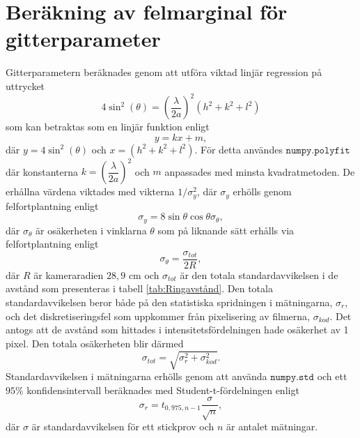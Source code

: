 \documentclass[12pt, a4paper]{article}
\begin{document}
\newpage

\appendix
\section{Beräkning av felmarginal för gitterparameter}
\label{app:felmarg_gitterparameter}
Gitterparametern beräknades genom att utföra viktad linjär regression på uttrycket
\begin{equation}
    4\sin^2(\theta) = \left(\dfrac \lambda {2a}\right)^2 (h^2+k^2+l^2)
\end{equation}
som kan betraktas som en linjär funktion enligt
\begin{equation}
    y = k x + m,
\end{equation}
där $y = 4\sin^2(\theta)$ och $x = (h^2+k^2+l^2)$. För detta användes $\texttt{numpy.polyfit}$ där konstanterna $k = \left(\dfrac \lambda {2a}\right)^2$ och $m$ anpassades 
med minsta kvadratmetoden. De erhållna värdena viktades med vikterna $1/\sigma^2_{y}$, där $\sigma_{y}$ erhölls genom felfortplantning enligt 
\begin{equation}
    \sigma_y = 8\sin\theta \cos\theta \sigma_\theta,
\end{equation}
där $\sigma_\theta$ är osäkerheten i vinklarna $\theta$ som på liknande sätt erhålls via felfortplantning enligt
\begin{equation}
    \sigma_\theta = \dfrac{\sigma_{tot}}{2R},
\end{equation}
där $R$ är kameraradien $28,9$ cm och $\sigma_{tot}$ är den totala standardavvikelsen i de avstånd som presenteras i tabell \ref{tab:Ringavstånd}. Den totala standardavvikelsen beror både
på den statistiska spridningen i mätningarna, $\sigma_r$, och det diskretiseringsfel som uppkommer från pixelisering av filmerna, $\sigma_{kod}$. Det antogs att de avstånd som hittades i intensitetsfördelningen 
hade osäkerhet av 1 pixel. Den totala osäkerheten blir därmed
\begin{equation}
    \sigma_{tot} = \sqrt{\sigma_r^2 + \sigma^2_{kod}}.
\end{equation} 
Standardavvikelsen i mätningarna erhölls genom att använda $\texttt{numpy.std}$ och ett $95\%$ konfidensintervall beräknades med Student-t-fördelningen enligt
\begin{equation}
    \sigma_r = t_{0,975, n-1}\dfrac{\sigma}{\sqrt{n}},
\end{equation}
där $\sigma$ är standardavvikelsen för ett stickprov och $n$ är antalet mätningar.
\end{document}
